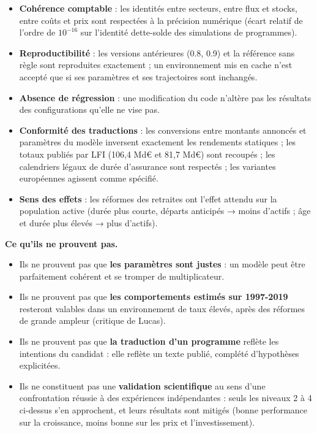 \documentclass[
  11pt,
  11pt,
  a4paper,
  openany]{book}
\providecommand{\tightlist}{%
  \setlength{\itemsep}{0pt}\setlength{\parskip}{0pt}}
\begin{document}
\begin{itemize}
\tightlist
\item
  \textbf{Cohérence comptable} : les identités entre secteurs, entre
  flux et stocks, entre coûts et prix sont respectées à la précision
  numérique (écart relatif de l'ordre de \(10^{-16}\) sur l'identité
  dette-solde des simulations de programmes).
\item
  \textbf{Reproductibilité} : les versions antérieures (0.8, 0.9) et la
  référence sans règle sont reproduites exactement ; un environnement
  mis en cache n'est accepté que si ses paramètres et ses trajectoires
  sont inchangés.
\item
  \textbf{Absence de régression} : une modification du code n'altère pas
  les résultats des configurations qu'elle ne vise pas.
\item
  \textbf{Conformité des traductions} : les conversions entre montants
  annoncés et paramètres du modèle inversent exactement les rendements
  statiques ; les totaux publiés par LFI (106,4 Md€ et 81,7 Md€) sont
  recoupés ; les calendriers légaux de durée d'assurance sont respectés
  ; les variantes européennes agissent comme spécifié.
\item
  \textbf{Sens des effets} : les réformes des retraites ont l'effet
  attendu sur la population active (durée plus courte, départs anticipés
  → moins d'actifs ; âge et durée plus élevés → plus d'actifs).
\end{itemize}

\textbf{Ce qu'ils ne prouvent pas.}

\begin{itemize}
\tightlist
\item
  Ils ne prouvent pas que \textbf{les paramètres sont justes} : un
  modèle peut être parfaitement cohérent et se tromper de
  multiplicateur.
\item
  Ils ne prouvent pas que \textbf{les comportements estimés sur
  1997-2019} resteront valables dans un environnement de taux élevés,
  après des réformes de grande ampleur (critique de Lucas).
\item
  Ils ne prouvent pas que \textbf{la traduction d'un programme} reflète
  les intentions du candidat : elle reflète un texte publié, complété
  d'hypothèses explicitées.
\item
  Ils ne constituent pas une \textbf{validation scientifique} au sens
  d'une confrontation réussie à des expériences indépendantes : seuls
  les niveaux 2 à 4 ci-dessus s'en approchent, et leurs résultats sont
  mitigés (bonne performance sur la croissance, moins bonne sur les prix
  et l'investissement).
\end{itemize}
\end{document}
